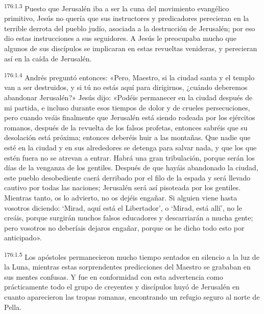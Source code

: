 \par 
\textsuperscript{176:1.3} Puesto que Jerusalén iba a ser la cuna del movimiento evangélico primitivo, Jesús no quería que sus instructores y predicadores perecieran en la terrible derrota del pueblo judío, asociada a la destrucción de Jerusalén; por eso dio estas instrucciones a sus seguidores. A Jesús le preocupaba mucho que algunos de sus discípulos se implicaran en estas revueltas venideras, y perecieran así en la caída de Jerusalén.

\par 
\textsuperscript{176:1.4} Andrés preguntó entonces: «Pero, Maestro, si la ciudad santa y el templo van a ser destruidos, y si tú no estás aquí para dirigirnos, ¿cuándo deberemos abandonar Jerusalén?» Jesús dijo: «Podéis permanecer en la ciudad después de mi partida, e incluso durante esos tiempos de dolor y de crueles persecuciones, pero cuando veáis finalmente que Jerusalén está siendo rodeada por los ejércitos romanos, después de la revuelta de los falsos profetas, entonces sabréis que su desolación está próxima; entonces deberéis huir a las montañas. Que nadie que esté en la ciudad y en sus alrededores se detenga para salvar nada, y que los que estén fuera no se atrevan a entrar. Habrá una gran tribulación, porque serán los días de la venganza de los gentiles. Después de que hayáis abandonado la ciudad, este pueblo desobediente caerá derribado por el filo de la espada y será llevado cautivo por todas las naciones; Jerusalén será así pisoteada por los gentiles. Mientras tanto, os lo advierto, no os dejéis engañar. Si alguien viene hasta vosotros diciendo: `Mirad, aquí está el Libertador', o `Mirad, está allí', no le creáis, porque surgirán muchos falsos educadores y descarriarán a mucha gente; pero vosotros no deberíais dejaros engañar, porque os he dicho todo esto por anticipado».

\par 
\textsuperscript{176:1.5} Los apóstoles permanecieron mucho tiempo sentados en silencio a la luz de la Luna, mientras estas sorprendentes predicciones del Maestro se grababan en sus mentes confusas. Y fue en conformidad con esta advertencia como prácticamente todo el grupo de creyentes y discípulos huyó de Jerusalén en cuanto aparecieron las tropas romanas, encontrando un refugio seguro al norte de Pella.

